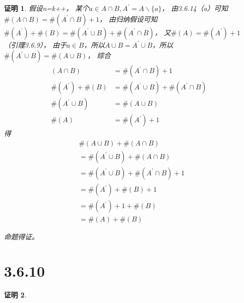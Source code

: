 \documentclass{article}
\theoremstyle{mystyle}
\theoremstyle{zproofstyle}
\newtheorem*{zproof}{证明}
\begin{document}
\begin{zproof}
  假设n=k++，
  某个$a \in A \cap B, A^\prime = A \backslash \{a\} $，
  由3.6.14（a）可知$\#(A \cap B) = \#(A^\prime \cap B) + 1$，
  由归纳假设可知$\#(A^\prime) + \#(B) = \#(A^\prime \cup B) + \#(A^\prime \cap B)$，
  又$\#(A)=\#(A^\prime)+1$（引理3.6.9），
  由于$a \in B$，所以$A \cup B = A^\prime \cup B$，所以$\#(A^\prime \cup B) = \#(A \cup B)$，
  综合
  \begin{align}
    (A \cap B)           & = \#(A^\prime \cap B) + 1                   \\
    \#(A^\prime) + \#(B) & = \#(A^\prime \cup B) + \#(A^\prime \cap B) \\
    \#(A^\prime \cup B)  & = \#(A \cup B)                              \\
    \#(A)                & = \#(A^\prime) + 1
  \end{align}
  得
  \begin{align*}
     & \#(A \cup B) + \#(A \cap B)                     \\
     & = \#(A^\prime \cup B) + \#(A \cap B)            \\
     & = \#(A^\prime \cup B) + \#(A^\prime \cap B) + 1 \\
     & = \#(A^\prime) + \#(B) + 1                      \\
     & = \#(A^\prime) + 1 + \#(B)                      \\
     & = \#(A) + \#(B)
  \end{align*}

  命题得证。
\end{zproof}

\section*{3.6.10}
\begin{zproof}

\end{zproof}
\end{document}
